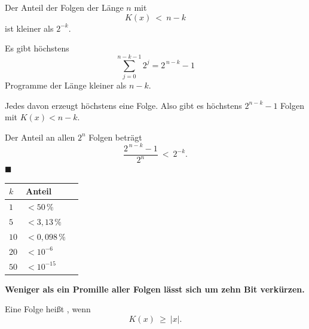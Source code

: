 \begin{merksatz}
Der Anteil der Folgen der Länge $n$ mit
\[ K(x) \ <\ n-k \]
ist kleiner als $2^{-k}$.

Es gibt höchstens
\[ \sum_{j=0}^{n-k-1} 2^{j} = 2^{\,n-k}-1 \]
Programme der Länge kleiner als $n-k$.

Jedes davon erzeugt höchstens eine Folge. Also gibt es höchstens $2^{n-k}-1$ Folgen mit $K(x) < n-k$.

Der Anteil an allen $2^{n}$ Folgen beträgt
\[ \frac{2^{\,n-k}-1}{2^{n}} \ <\ 2^{-k} . \]
$\blacksquare$

\begin{center}
{\small
\renewcommand{\arraystretch}{1.48}
\begin{tabular}{@{}P{1.6cm}P{2.4cm}P{2.8cm}@{}}
\toprule
$k$ & \textbf{Anteil} & \\
\midrule
$1$ & $<50\,\%$ & \\
$5$ & $<3{,}13\,\%$ & \\
$10$ & $<0{,}098\,\%$ & \\
$20$ & $<10^{-6}$ & \\
$50$ & $<10^{-15}$ & \\
\bottomrule
\end{tabular}}
\end{center}

\begin{center}
\begin{minipage}{0.9\textwidth}
\textbf{Weniger als ein Promille aller Folgen lässt sich um zehn Bit verkürzen.}
\end{minipage}
\end{center}

\begin{center}
\begin{minipage}{0.88\textwidth}
\end{minipage}
\end{center}
\end{merksatz}

\begin{definition}
Eine Folge heißt , wenn
\[ K(x) \ \ge\ |x| . \]
\end{definition}

